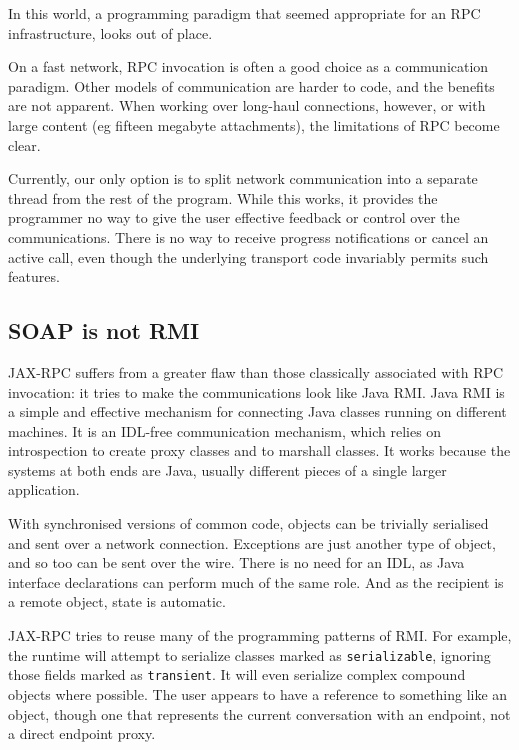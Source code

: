 In this world, a programming paradigm that seemed appropriate for an RPC
infrastructure, looks out of place.


On a fast network, RPC invocation is often a good choice as a
communication paradigm. Other models of communication are harder to
code, and the benefits are not apparent. When working over long-haul
connections, however, or with large content (eg fifteen megabyte
attachments), the limitations of RPC become clear. 

Currently, our only option is to split network communication into a
separate thread from the rest of the program. While this works, it
provides the programmer no way to give the user effective feedback or
control over the communications. There is no way to receive progress
notifications or cancel an active call, even though the underlying
transport code invariably permits such features.


\subsection{SOAP is not RMI}
\label{objections:soap-not-rmi}

JAX-RPC suffers from a greater flaw than those classically associated
with RPC invocation: it tries to make the communications look like
Java RMI. Java RMI is a simple and effective mechanism for connecting
Java classes running on different machines. It is an IDL-free
communication mechanism, which relies on introspection to create proxy
classes and to marshall classes. It works because the systems at both
ends are Java, usually different pieces of a single larger
application.

With synchronised versions of common code, objects can be trivially
serialised and sent over a network connection. Exceptions are just
another type of object, and so too can be sent over the wire. There is
no need for an IDL, as Java interface declarations can perform much of
the same role. And as the recipient is a remote object, state is
automatic.

JAX-RPC tries to reuse many of the programming patterns of RMI. For
example, the runtime will attempt to serialize classes marked as
\verb|serializable|, ignoring those fields marked as
\verb|transient|. It will even serialize complex compound objects where
possible. The user appears to have a reference to something like an
object, though one that represents the current conversation with an
endpoint, not a direct endpoint proxy.

